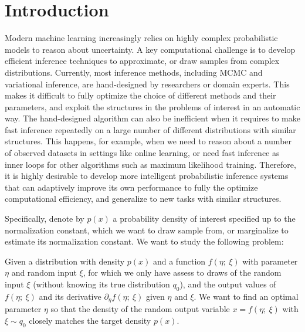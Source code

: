 \documentclass{article} %
\begin{document}
\section{Introduction}


Modern machine learning increasingly relies on highly complex probabilistic models to reason about uncertainty.  
A key computational challenge is to develop efficient inference techniques to approximate, or draw samples from complex distributions. 
Currently, most inference methods, including MCMC and variational inference, are hand-designed by researchers or domain experts. 
%
This makes it difficult to fully optimize the choice of different methods and their parameters, and exploit the structures in the problems of interest in an automatic way. 
%
The hand-designed algorithm can also be inefficient when it requires to make fast inference repeatedly on a large number of different distributions with similar structures. 
%
This happens, for example, when we need to reason about a number of observed datasets in settings like online learning, 
or need fast inference as inner loops for other algorithms such as maximum likelihood training. 
Therefore, it is highly desirable to develop more intelligent probabilistic inference systems that can adaptively improve its own performance to fully the optimize computational efficiency, and generalize to new tasks with similar structures. 

Specifically, denote by $p(x)$ a probability density of interest specified up to the normalization constant, which we want to draw sample from, or marginalize to estimate its normalization constant. We want to study the following problem: 

\begin{problem}\label{pro:prob1}
Given a distribution with density $p(x)$ %
and a function $f(\eta;~\xi)$ with parameter $\eta$ and random input $\xi$, 
for which we only have assess to draws of the random input $\xi$ (without knowing its true distribution $q_0$), 
and the output values of $f(\eta;~\xi)$ and its derivative $\partial_\eta f(\eta;~\xi)$ given $\eta$ and $\xi$.  
We want to find an optimal parameter $\eta$ so that the density of the random output variable $x = f(\eta;~\xi)$ with $\xi\sim q_0$ closely matches the target density $p(x)$. 
\end{problem}
\end{document}
